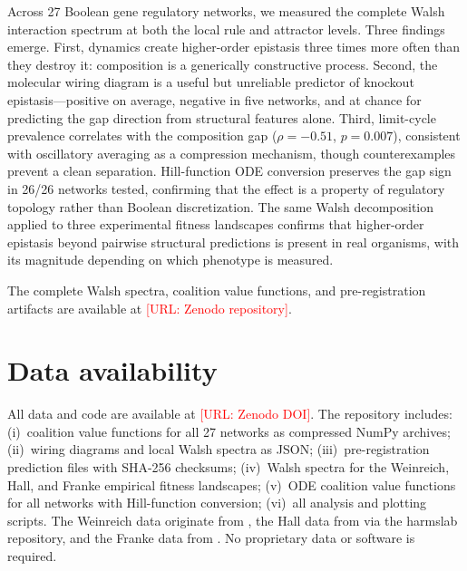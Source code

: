 \documentclass[10pt]{article}
\begin{document}
Across 27 Boolean gene regulatory networks, we measured the complete
Walsh interaction spectrum at both the local rule and attractor
levels. Three findings emerge. First, dynamics create higher-order
epistasis three times more often than they destroy it: composition
is a generically constructive process. Second, the molecular wiring
diagram is a useful but unreliable predictor of knockout
epistasis---positive on average, negative in five networks, and at
chance for predicting the gap direction from structural features
alone. Third, limit-cycle prevalence correlates with the composition
gap ($\rho = -0.51$, $p = 0.007$), consistent with oscillatory
averaging as a compression mechanism, though counterexamples prevent
a clean separation. Hill-function ODE conversion preserves the gap
sign in 26/26 networks tested, confirming that the effect is a
property of regulatory topology rather than Boolean discretization.
The same Walsh decomposition applied to three experimental fitness
landscapes confirms that higher-order epistasis beyond pairwise
structural predictions is present in real organisms, with its
magnitude depending on which phenotype is measured.


The complete Walsh spectra, coalition value functions, and
pre-registration artifacts are available at
\textcolor{red}{[URL: Zenodo repository]}.


\section*{Data availability}

All data and code are available at \textcolor{red}{[URL: Zenodo DOI]}.
The repository includes: (i)~coalition value functions for all 27
networks as compressed NumPy archives; (ii)~wiring diagrams and local
Walsh spectra as JSON; (iii)~pre-registration prediction files with
SHA-256 checksums; (iv)~Walsh spectra for the Weinreich, Hall, and Franke
empirical fitness landscapes; (v)~ODE coalition value functions for
all networks with Hill-function conversion; (vi)~all analysis and
plotting scripts.
The Weinreich data originate from \citet{weinreich2006darwinian},
the Hall data from \citet{hall2010fitness} via the harmslab
repository, and the Franke data from \citet{franke2011evolutionary}.
No proprietary data or software is required.
\end{document}
